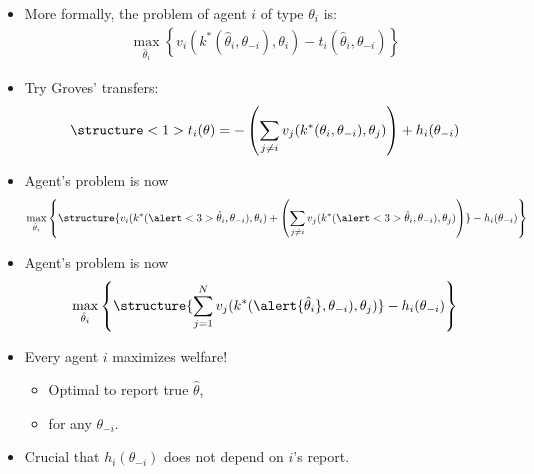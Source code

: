 \documentclass[english,handout,10pt]{beamer}		%
\def\lyxframeend{} %
\begin{document}
\begin{itemize}
	\item More formally, the problem of agent $i$ of type $\theta_i$ is:
		\vspace{-0.5em}\begin{align*}
		\max_{\hat{\theta}_i} \left\{  v_i(k^*(\hat{\theta}_i,\theta_{-i}),\theta_i) - t_i(\hat{\theta}_i,\theta_{-i}) \right\}
		\end{align*}\vspace{-1em}
	\item Try \alert<1>{Groves' transfers}:
		\vspace{-0.5em}\begin{align*}
		\structure<1>{ t_{i}(\theta)=-\left(\sum_{j\neq i} v_{j}(k^*(\theta_i, \theta_{-i}), \theta_{j}) \right) + h_{i}(\theta_{-i}) }
		\end{align*}\vspace{-1em}
	\pause
	\item Agent's problem is now
		\vspace{-0.5em}\begin{align*}
		\max_{\hat{\theta}_i} \left\{ \structure{v_i(k^*(\alert<3>{\hat{\theta}_i},\theta_{-i}),\theta_i) + \left( \sum_{j\neq i} v_{j}(k^*(\alert<3>{\hat{\theta}_i},\theta_{-i}), \theta_{j}) \right)} - h_{i}(\theta_{-i}) \right\}
		\end{align*}
\end{itemize}
\lyxframeend


\begin{itemize}
	\item Agent's problem is now
		\vspace{-0.5em}\begin{align*}
		\max_{\hat{\theta}_i} \left\{ \structure{ \sum_{j=1}^N v_{j}(k^*(\alert{\hat{\theta}_i},\theta_{-i}), \theta_{j}) } - h_{i}(\theta_{-i}) \right\}
		\end{align*}
	\item Every agent $i$ maximizes welfare!
	\begin{itemize}
		\item Optimal to report true $\hat{\theta}$,
		\item for any $\theta_{-i}$.
	\end{itemize}
	\item Crucial that $h_i(\theta_{-i})$ does not depend on $i$'s report.
\end{itemize}
\lyxframeend
\end{document}
